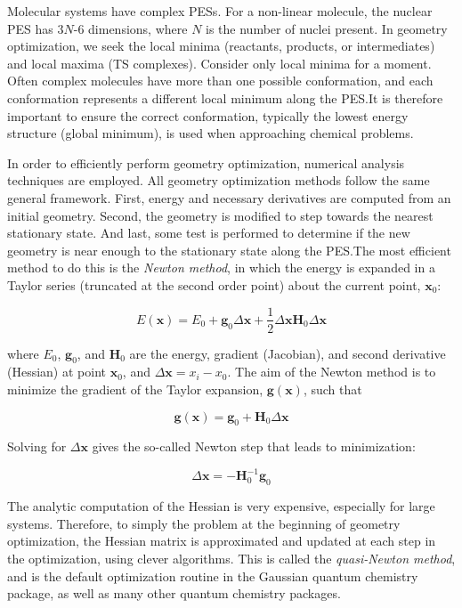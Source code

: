 Molecular systems have complex PESs. For a non-linear molecule, the nuclear PES
has 3$N$-6 dimensions, where $N$ is the number of nuclei
present.\cite{Heidrich1991} In geometry optimization, we seek the local minima
(reactants, products, or intermediates) and local maxima (TS complexes).
Consider only local minima for a moment. Often complex molecules have more than
one possible conformation, and each conformation represents a different local
minimum along the PES.\@ It is therefore important to ensure the correct
conformation, typically the lowest energy structure (global minimum), is used
when approaching chemical problems.

In order to efficiently perform geometry optimization, numerical analysis
techniques are employed. All geometry optimization methods follow the same
general framework.\cite{Hratchian2005} First, energy and necessary derivatives
are computed from an initial geometry. Second, the geometry is modified to step
towards the nearest stationary state. And last, some test is performed to
determine if the new geometry is near enough to the stationary state along the
PES.\@ The most efficient method to do this is the \emph{Newton method}, in
which the energy is expanded in a Taylor series (truncated at the second order
point) about the current point, $\mathbf{x}_0$:

\begin{equation}
  E(\mathbf{x}) = E_0 + \mathbf{g}_0\Delta\mathbf{x} + \frac{1}{2}\Delta\mathbf{x}\mathbf{H}_0\Delta \mathbf{x}
\end{equation}

\noindent where $E_0$, $\mathbf{g}_0$, and $\mathbf{H}_0$ are the energy,
gradient (Jacobian), and second derivative (Hessian) at point $\mathbf{x}_0$,
and $\Delta \mathbf{x} = x_i - x_0$. The aim of the Newton method is to
minimize the gradient of the Taylor expansion, $\mathbf{g(x)}$, such that

\begin{equation}
  \mathbf{g(x)} = \mathbf{g}_0 + \mathbf{H}_0 \Delta \mathbf{x}
\end{equation}

\noindent Solving for $\Delta \mathbf{x}$ gives the so-called Newton step that
leads to minimization:

\begin{equation}
  \Delta \mathbf{x} = -\mathbf{H}^{-1}_0\mathbf{g}_0
\end{equation}

The analytic computation of the Hessian is very expensive, especially for large
systems. Therefore, to simply the problem at the beginning of geometry
optimization, the Hessian matrix is approximated and updated at each step in
the optimization, using clever algorithms.\cite{Hratchian2005} This is called
the \emph{quasi-Newton method}, and is the default optimization routine in the
Gaussian\cite{Frisch2009} quantum chemistry package, as well as many other
quantum chemistry packages.

